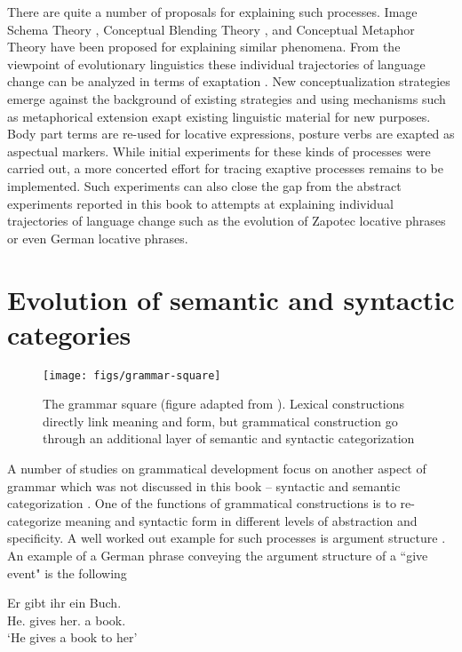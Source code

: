 There are quite a number of proposals for explaining such processes. 
Image Schema Theory \citep{johnson1987body}, 
Conceptual Blending Theory \citep{fauconnier1994mental}, and
Conceptual Metaphor Theory \citep{lakoff1980metaphors}
have been proposed for explaining similar phenomena.
From the viewpoint of evolutionary linguistics these individual 
trajectories of language change can be analyzed in terms of exaptation 
\citep{lass1990things,lass1997historical}. New conceptualization strategies emerge 
against the background of existing
strategies and using mechanisms such as metaphorical extension exapt
existing linguistic material for new purposes. Body part terms are re-used
for locative expressions, posture verbs are exapted as aspectual markers.
While initial experiments for these kinds of processes were carried out, a 
more concerted effort for tracing exaptive processes remains to be implemented.
Such experiments can also close the gap from the abstract experiments reported
in this book to attempts at explaining individual trajectories of language change
such as the evolution of Zapotec locative phrases or even German locative phrases.

\section{Evolution of semantic and syntactic categories}
\begin{figure}
	\begin{center}
		\texttt{[image: figs/grammar-square]}
	\end{center}
	\caption[Grammar square]{The grammar square (figure 
		adapted from \citealt{steels2011design}). Lexical constructions directly link meaning
		and form, but grammatical construction go through an additional layer of
		semantic and syntactic categorization}
	\label{f:grammar-square}
\end{figure}
\noindent A number of studies on grammatical development focus on another aspect
of grammar which was not discussed in this book -- syntactic and semantic categorization \citep{steels2011phrasal}.
One of the functions of grammatical constructions is to re-categorize meaning 
and syntactic form in different levels of abstraction and specificity. 
A well worked out example for such processes is argument structure 
\citep{steels2002case,steels2007multi-level,vantrijp2008phd}. 
An example of a German phrase conveying the argument structure of a ``give event"
is the following 
\begin{exe}
	\ex
\gll Er gibt ihr ein Buch.\\
{He.\NOM} gives {her.\DAT} a {book.\ACC}\\
\glt `He gives a book to her'
\end{exe}

